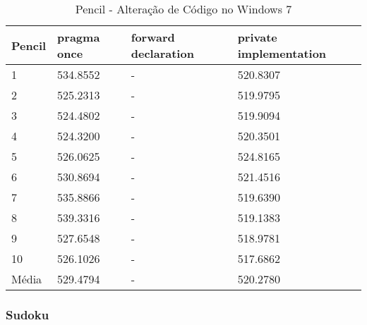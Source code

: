 \begin{table}[!h]
\centering
\caption{Pencil - Alteração de Código no Windows 7}
\label{tab:alteracao_de_codigo:windows:pencil}
\begin{tabular}{llll}
\textbf{Pencil} & \textbf{pragma once} & \textbf{forward declaration} & \textbf{private implementation}   \\ \toprule
1                                    & 534.8552 &  -   & 520.8307 \\ 
2                                    & 525.2313 &  -   & 519.9795 \\ 
3                                    & 524.4802 &  -   & 519.9094 \\ 
4                                    & 524.3200 &  -   & 520.3501 \\ 
5                                    & 526.0625 &  -   & 524.8165 \\ 
6                                    & 530.8694 &  -   & 521.4516 \\ 
7                                    & 535.8866 &  -   & 519.6390 \\ 
8                                    & 539.3316 &  -   & 519.1383 \\ 
9                                    & 527.6548 &  -   & 518.9781 \\ 
10                                   & 526.1026 &  -   & 517.6862 \\ \bottomrule 
Média                                & 529.4794 &  -   & 520.2780 \\
\end{tabular}
\end{table}


\clearpage
\subsubsection*{Sudoku}

